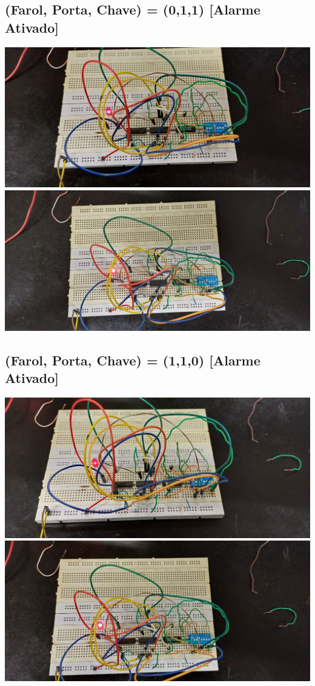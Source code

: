 \documentclass[]{article}
\begin{document}
		\subsection{(Farol, Porta, Chave) = (0,1,1) [Alarme Ativado]}
			\includegraphics[scale=0.25]{Images/Protoboard 011 Down.jpeg} \\
			\includegraphics[scale=0.25]{Images/Protoboard 011 Top.jpeg} \\
		\subsection{(Farol, Porta, Chave) = (1,1,0) [Alarme Ativado]}
			\includegraphics[scale=0.25]{Images/Protoboard 110 Down.jpeg} \\
			\includegraphics[scale=0.25]{Images/Protoboard 110 Top.jpeg} \\
\end{document}
